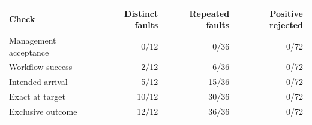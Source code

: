 \begin{tabular}{lrrr}\toprule
Check & Distinct faults & Repeated faults & Positive rejected \\\midrule
Management acceptance & 0/12 & 0/36 & 0/72 \\
Workflow success & 2/12 & 6/36 & 0/72 \\
Intended arrival & 5/12 & 15/36 & 0/72 \\
Exact at target & 10/12 & 30/36 & 0/72 \\
Exclusive outcome & 12/12 & 36/36 & 0/72 \\
\bottomrule\end{tabular}
